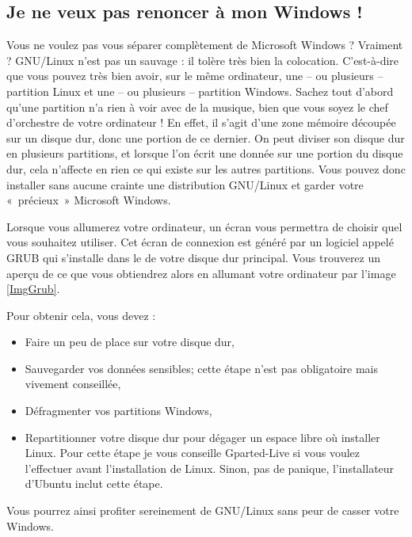 \subsection{Je ne veux pas renoncer à mon Windows !}
\label{RefKeepWindows}
Vous ne voulez pas vous séparer complètement de Microsoft Windows ? Vraiment ? GNU/Linux n'est pas un sauvage : il tolère très bien la colocation. C'est-à-dire que vous pouvez très bien avoir, sur le même ordinateur, une -- ou plusieurs -- partition Linux et une -- ou plusieurs -- partition Windows. Sachez tout d'abord qu'une partition n'a rien à voir avec de la musique, bien que vous soyez le chef d'orchestre de votre ordinateur ! En effet, il s'agit d'une zone mémoire découpée sur un disque dur, donc une portion de ce dernier. On peut diviser son disque dur en plusieurs partitions, et lorsque l'on écrit une donnée sur une portion du disque dur, cela n'affecte en rien ce qui existe sur les autres partitions. Vous pouvez donc installer sans aucune crainte une distribution GNU/Linux et garder votre «~précieux~» Microsoft Windows.\par
Lorsque vous allumerez votre ordinateur, un écran vous permettra de choisir quel  vous souhaitez utiliser. Cet écran de connexion est généré par un logiciel appelé GRUB qui s'installe dans le  de votre disque dur principal. Vous trouverez un aperçu de ce que vous obtiendrez alors en allumant votre ordinateur par l'image \ref{ImgGrub}.\par
{}
Pour obtenir cela, vous devez :
\begin{itemize}
\item Faire un peu de place sur votre disque dur,
\item Sauvegarder vos données sensibles; cette étape n'est pas obligatoire mais vivement conseillée,
\item Défragmenter vos partitions Windows,
\item Repartitionner votre disque dur pour dégager un espace libre où installer Linux. Pour cette étape je vous conseille Gparted-Live si vous voulez l'effectuer avant l'installation de Linux. Sinon, pas de panique, l'installateur d'Ubuntu inclut cette étape.
\end{itemize}
Vous pourrez ainsi profiter sereinement de GNU/Linux sans peur de casser votre Windows.
